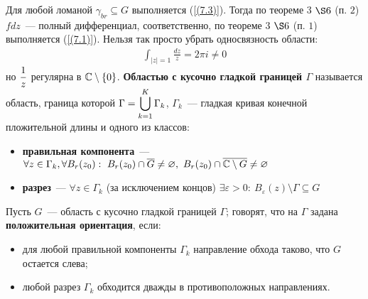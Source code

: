 Для любой ломаной $\gamma_{br}\subseteq G$ выполняется (\ref{(7.3)}).
Тогда по теореме $3$ $\S 6$ (п. $2$) $f dz$~--- полный дифференциал,
соответственно, по теореме $3$ $\S 6$ (п. $1$) выполняется (\ref{(7.1)}).
\note
Нельзя так просто убрать односвязность области:
\begin{align*}
  \int_{\left| z \right| = 1} \frac{dz}{z} = 2 \pi i \neq 0
\end{align*}
но $\displaystyle \frac{1}{z}$ регулярна в $\mathbb{C} \setminus \{0\}$.
\Def
\textbf{Областью с кусочно гладкой границей $\Gamma$} называется область,
граница которой $\Gamma = \displaystyle \bigcup_{k=1}^K\Gamma_k$, $\Gamma_k$~--- гладкая
кривая конечной пложительной длины и одного из классов:
\begin{itemize}
    \item \textbf{правильная компонента}~--- $\forall z \in \Gamma_k, \forall
    B_r(z_0): \ B_r(z_0)\cap \overline{G} \neq \varnothing, \ B_r(z_0) \cap
    \overline{\mathbb{C}\setminus G} \neq \varnothing$
    \item \textbf{разрез}~--- $\forall z \in \Gamma_k$ (за исключением концов)
    $\exists \varepsilon > 0: \ B_{\varepsilon}(z) \setminus \Gamma \subseteq G$
\end{itemize}
\Def
Пусть $G$~--- область с кусочно гладкой границей $\Gamma$; говорят, что на
$\Gamma$ задана \textbf{положительная ориентация}, если:
\begin{itemize}
    \item для любой правильной компоненты $\Gamma_k$ направление обхода таково,
    что $G$ остается слева;
    \item любой разрез $\Gamma_k$ обходится дважды в противоположных
    направлениях.
\end{itemize}

